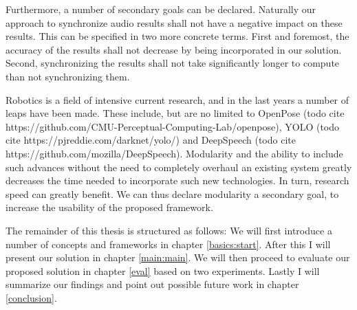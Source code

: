 Furthermore, a number of secondary goals can be declared.
Naturally our approach to synchronize audio results shall not have a negative impact on these results.
This can be specified in two more concrete terms.
First and foremost, the accuracy of the results shall not decrease by being incorporated in our solution.
Second, synchronizing the results shall not take significantly longer to compute than not synchronizing them.


Robotics is a field of intensive current research, and in the last years a number of leaps have been made.
These include, but are no limited to OpenPose (todo cite https://github.com/CMU-Perceptual-Computing-Lab/openpose), YOLO (todo cite https://pjreddie.com/darknet/yolo/) and DeepSpeech (todo cite https://github.com/mozilla/DeepSpeech).
Modularity and the ability to include such advances without the need to completely overhaul an existing system greatly decreases the time needed to incorporate such new technologies.
In turn, research speed can greatly benefit.
We can thus declare modularity a secondary goal, to increase the usability of the proposed framework.


The remainder of this thesis is structured as follows:
We will first introduce a number of concepts and frameworks in chapter \ref{basics:start}.
After this I will present our solution in chapter \ref{main:main}.
We will then proceed to evaluate our proposed solution in chapter \ref{eval} based on two experiments.
Lastly I will summarize our findings and point out possible future work in chapter \ref{conclusion}.


